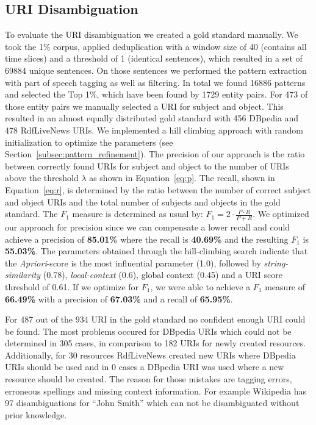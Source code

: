 \documentclass[a4paper]{llncs}
\newcommand{\NAME}{RdfLiveNews}
\begin{document}
\subsection{URI Disambiguation}
To evaluate the URI disambiguation we created a gold standard manually.
We took the 1\% corpus, applied deduplication with a window size of 40 (contains all time slices) and a threshold of 1 (identical sentences), which resulted in a set of 69884 unique sentences.
On those sentences we performed the pattern extraction with part of speech tagging as well as filtering.
In total we found 16886 patterns and selected the Top 1\%, which have been found by 1729 entity pairs.
For 473 of those entity pairs we manually selected a URI for subject and object.
This resulted in an almost equally distributed gold standard with 456 DBpedia and 478 \NAME{} URIs.
We implemented a hill climbing approach with random initialization to optimize the parameters (see Section~\ref{subsec:pattern_refinement}).
The precision of our approach is the ratio between correctly found URIs for subject and object to the number of URIs above the threshold $\lambda$ as shown in Equation~\ref{eq:p}.
The recall, shown in Equation~\ref{eq:r}, is determined by the ratio between the number of correct subject and object URIs and the total number of subjects and objects in the gold standard.
The $F_1$ measure is determined as usual by: $F_1=2 \cdot \frac{P \cdot R}{P + R}$.
We optimized our approach for precision since we can compensate a lower recall and could achieve a precision of \textbf{85.01\%} where the recall is \textbf{40.69\%} and the resulting $F_1$ is \textbf{55.03\%}.
The parameters obtained through the hill-climbing search indicate that the \emph{Apriori}-score is the most influential parameter (1.0), followed by \emph{string-similarity} (0.78), \emph{local-context} (0.6), global context (0.45) and a URI score threshold of 0.61.
If we optimize for $F_1$, we were able to achieve a $F_1$ measure of \textbf{66.49\%} with a precision of \textbf{67.03\%} and a recall of \textbf{65.95\%}.

For 487 out of the 934 URI in the gold standard no confident enough URI could be found.
The most problems occured for DBpedia URIs which could not be determined in 305 cases, in comparison to 182 URIs for newly created resources.
Additionally, for 30 resources \NAME{} created new URIs where DBpedia URIs should be used and in 0 cases a DBpedia URI was used where a new resource should be created.
The reason for those mistakes are tagging errors, erroneous spellings and missing context information.
For example Wikipedia has 97 disambiguations for ``John Smith'' which can not be disambiguated without prior knowledge.
\end{document}
